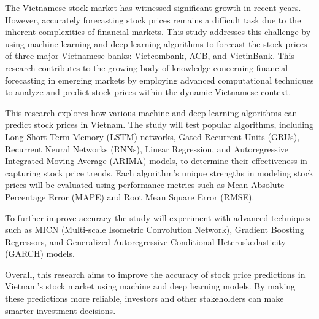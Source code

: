 \documentclass{ieeeojies}
\begin{document}
\noindent The Vietnamese stock market has witnessed significant growth in recent years. However, accurately forecasting stock prices remains a difficult task due to the inherent complexities of financial markets. This study addresses this challenge by using machine learning and deep learning algorithms to forecast the stock prices of three major Vietnamese banks: Vietcombank, ACB, and VietinBank. This research contributes to the growing body of knowledge concerning financial forecasting in emerging markets by employing advanced computational techniques to analyze and predict stock prices within the dynamic Vietnamese context.

\noindent This research explores how various machine and deep learning algorithms can predict stock prices in Vietnam. The study will test popular algorithms, including Long Short-Term Memory (LSTM) networks, Gated Recurrent Units (GRUs), Recurrent Neural Networks (RNNs), Linear Regression, and Autoregressive Integrated Moving Average (ARIMA) models, to determine their effectiveness in capturing stock price trends. Each algorithm's unique strengths in modeling stock prices will be evaluated using performance metrics such as Mean Absolute Percentage Error (MAPE) and Root Mean Square Error (RMSE).

\noindent To further improve accuracy the study will experiment with advanced techniques such as MICN (Multi-scale Isometric Convolution Network), Gradient Boosting Regressors, and Generalized Autoregressive Conditional Heteroskedasticity (GARCH) models.

\noindent Overall, this research aims to improve the accuracy of stock price predictions in Vietnam's stock market using machine and deep learning models. By making these predictions more reliable, investors and other stakeholders can make smarter investment decisions.

\label{sec:introduction}
 
\end{document}

